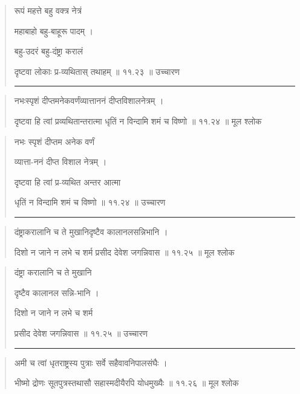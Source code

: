 \begin{quotation}

रूपं महत्ते बहु वक्त्र नेत्रं 

महाबाहो बहु-बाहूरू पादम्‌  ।  

बहु-उदरं बहु-दंष्ट्रा करालं 

दृष्टवा लोकाः प्र-व्यथितास् तथाहम्‌  ॥ ११.२३ ॥  उच्चारण

\noindent\rule{16cm}{0.4pt} 
\end{quotation}


\begin{quotation} 

नभःस्पृशं दीप्तमनेकवर्णंव्यात्ताननं दीप्तविशालनेत्रम्‌  ।  

दृष्टवा हि त्वां प्रव्यथितान्तरात्मा धृतिं न विन्दामि शमं च विष्णो  ॥ ११.२४ ॥  मूल श्लोक
\end{quotation}

\begin{quotation}




नभः स्पृशं दीप्तम अनेक वर्णं

व्यात्ता-ननं दीप्त विशाल नेत्रम्‌  ।  

दृष्टवा हि त्वां प्र-व्यथित अन्तर आत्मा

धृतिं न विन्दामि शमं च विष्णो  ॥ ११.२४ ॥  उच्चारण

\noindent\rule{16cm}{0.4pt} 
\end{quotation}


\begin{quotation} 

दंष्ट्राकरालानि च ते मुखानिदृष्टैव कालानलसन्निभानि  ।  

दिशो न जाने न लभे च शर्म प्रसीद देवेश जगन्निवास  ॥ ११.२५ ॥  मूल श्लोक
\end{quotation}

\begin{quotation}

दंष्ट्रा करालानि च ते मुखानि 

दृष्टैव कालानल सन्नि-भानि  ।  

दिशो न जाने न लभे च शर्म 

प्रसीद देवेश जगन्निवास  ॥ ११.२५ ॥  उच्चारण

\noindent\rule{16cm}{0.4pt} 
\end{quotation}


\begin{quotation} 

अमी च त्वां धृतराष्ट्रस्य पुत्राः सर्वे सहैवावनिपालसंघैः  ।  

भीष्मो द्रोणः सूतपुत्रस्तथासौ सहास्मदीयैरपि योधमुख्यैः  ॥ ११.२६ ॥  मूल श्लोक
\end{quotation}

